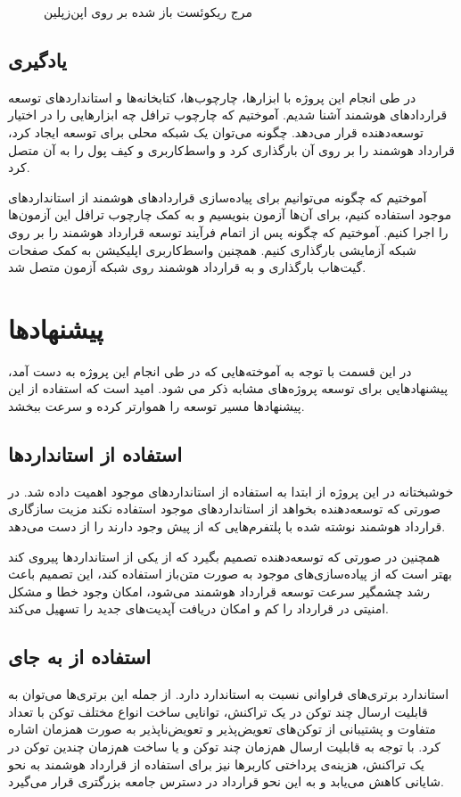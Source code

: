\begin{figure}[H]
\centerline{}
\caption{مرج ریکوئست باز شده بر روی اپن‌زپلین}
\label{fig:oz-mergereq}
\end{figure}


\subsection{یادگیری}
در طی انجام این پروژه با ابزارها، چارچوب‌ها، کتابخانه‌ها و استانداردهای توسعه قراردادهای هوشمند آشنا شدیم.
آموختیم که چارچوب ترافل چه ابزارهایی را در اختیار توسعه‌دهنده قرار می‌دهد.
چگونه می‌توان یک شبکه محلی برای توسعه ایجاد کرد،
قرارداد هوشمند را بر روی آن بارگذاری کرد و واسط‌کاربری و کیف پول را به آن متصل کرد.

آموختیم که چگونه می‌توانیم برای پیاده‌سازی قراردادهای هوشمند از استانداردهای موجود استفاده کنیم،
برای آن‌ها آزمون بنویسیم و به کمک چارچوب ترافل این آزمون‌ها را اجرا کنیم.
آموختیم که چگونه پس از اتمام فرآیند توسعه قرارداد هوشمند را بر روی شبکه آزمایشی بارگذاری کنیم.
همچنین واسط‌کاربری اپلیکیشن به کمک صفحات گیت‌هاب بارگذاری و به قرارداد هوشمند روی شبکه آزمون متصل شد.


\section{پیشنهادها}
در این قسمت با توجه به آموخته‌هایی که در طی انجام این پروژه به دست آمد،
پیشنهادهایی برای توسعه پروژه‌های مشابه ذکر می شود.
امید است که استفاده از این پیشنهادها مسیر توسعه را هموارتر کرده و سرعت ببخشد.

\subsection{استفاده از استانداردها}
خوشبختانه در این پروژه از ابتدا به استفاده از استانداردهای موجود اهمیت داده شد.
در صورتی که توسعه‌دهنده بخواهد از استانداردهای موجود استفاده نکند مزیت سازگاری
قرارداد هوشمند نوشته شده با پلتفرم‌هایی که از پیش وجود دارند را از دست می‌دهد.

همچنین در صورتی که توسعه‌دهنده تصمیم بگیرد که از یکی از استانداردها پیروی کند
بهتر است که از پیاده‌سازی‌های موجود به صورت متن‌باز استفاده کند، این تصمیم باعث
رشد چشمگیر سرعت توسعه قرارداد هوشمند می‌شود، امکان وجود خطا و مشکل امنیتی در قرارداد را کم
و امکان دریافت آپدیت‌های جدید را تسهیل می‌کند.


\subsection{استفاده از  به جای }
استاندارد
برتری‌های فراوانی نسبت به استاندارد
دارد.
از جمله این برتری‌ها می‌توان به قابلیت ارسال چند توکن در یک تراکنش،
توانایی ساخت انواع مختلف توکن با تعداد متفاوت و
پشتیبانی از توکن‌های تعویض‌پذیر و تعویض‌ناپذیر به صورت همزمان اشاره کرد.
با توجه به قابلیت ارسال هم‌زمان چند توکن و یا ساخت هم‌زمان چندین توکن در یک تراکنش،
هزینه‌ی پرداختی کاربرها نیز
برای استفاده از قرارداد هوشمند به نحو شایانی کاهش می‌یابد و به این نحو قرارداد در دسترس
جامعه بزرگتری قرار می‌گیرد.

